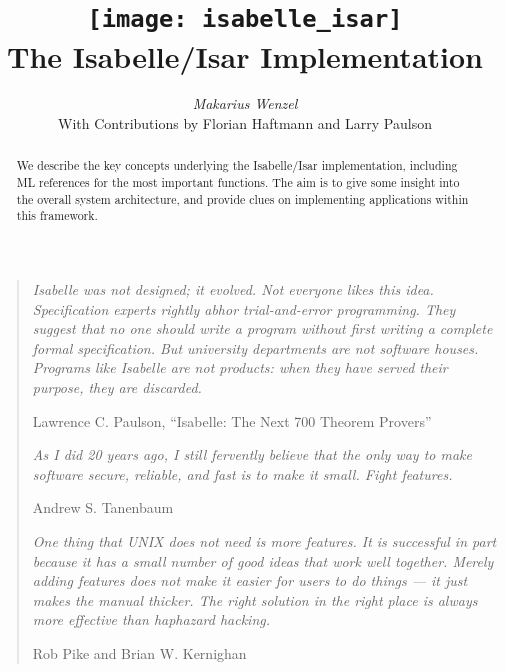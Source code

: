 \documentclass[12pt,a4paper,fleqn]{report}
\title{\texttt{[image: isabelle\_isar]}
  \\[4ex] The Isabelle/Isar Implementation}
\author{\emph{Makarius Wenzel}  \\[3ex]
  With Contributions by
  Florian Haftmann
  and Larry Paulson
}
\begin{document}
\maketitle

\begin{abstract}
  We describe the key concepts underlying the Isabelle/Isar
  implementation, including ML references for the most important
  functions.  The aim is to give some insight into the overall system
  architecture, and provide clues on implementing applications within
  this framework.
\end{abstract}

\vspace*{2.5cm}
\begin{quote}

  {\small\em Isabelle was not designed; it evolved.  Not everyone
    likes this idea.  Specification experts rightly abhor
    trial-and-error programming.  They suggest that no one should
    write a program without first writing a complete formal
    specification. But university departments are not software houses.
    Programs like Isabelle are not products: when they have served
    their purpose, they are discarded.}

  Lawrence C. Paulson, ``Isabelle: The Next 700 Theorem Provers''

  \vspace*{1cm}

  {\small\em As I did 20 years ago, I still fervently believe that the
    only way to make software secure, reliable, and fast is to make it
    small.  Fight features.}

  Andrew S. Tanenbaum

  \vspace*{1cm}

  {\small\em One thing that UNIX does not need is more features. It is
    successful in part because it has a small number of good ideas
    that work well together. Merely adding features does not make it
    easier for users to do things --- it just makes the manual
    thicker. The right solution in the right place is always more
    effective than haphazard hacking.}

  Rob Pike and Brian W. Kernighan

\end{quote}

\thispagestyle{empty}\clearpage

\tableofcontents
\listoffigures
\clearfirst

\setcounter{chapter}{-1}











\begingroup
\tocentry{\bibname}
 \small\raggedright\frenchspacing

\endgroup

\tocentry{\indexname}
\printindex
\end{document}
